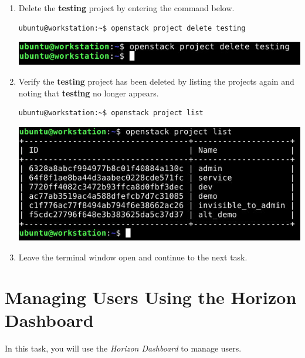 \documentclass[letterpaper, 12pt]{article}
\begin{document}
\begin{enumerate}
    \item Delete the \textbf{testing} project by entering the command below.
\begin{lstlisting}
ubuntu@workstation:~$ openstack project delete testing
\end{lstlisting}

    \begin{center}
        \includegraphics[width=\linewidth]{images/part2/step6.png}
    \end{center}

    \item Verify the \textbf{testing} project has been deleted by listing the projects again and noting that
    \textbf{testing} no longer appears.
\begin{lstlisting}
ubuntu@workstation:~$ openstack project list
\end{lstlisting}

    \begin{center}
        \includegraphics[width=\linewidth]{images/part2/step7.png}
    \end{center}

    \item Leave the terminal window open and continue to the next task.
\end{enumerate}

\section{Managing Users Using the Horizon Dashboard}
\label{sec:managing_users_using_the_horizon_dashboard}
In this task, you will use the \textit{Horizon Dashboard} to manage users.
\end{document}
